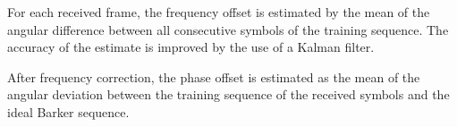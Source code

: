 For each received frame, the frequency offset is estimated by the mean of the angular difference between all consecutive symbols of the training sequence. The accuracy of the estimate is improved by the use of a Kalman filter.

After frequency correction, the phase offset is estimated as the mean of the angular deviation between the training sequence of the received symbols and the ideal Barker sequence.


